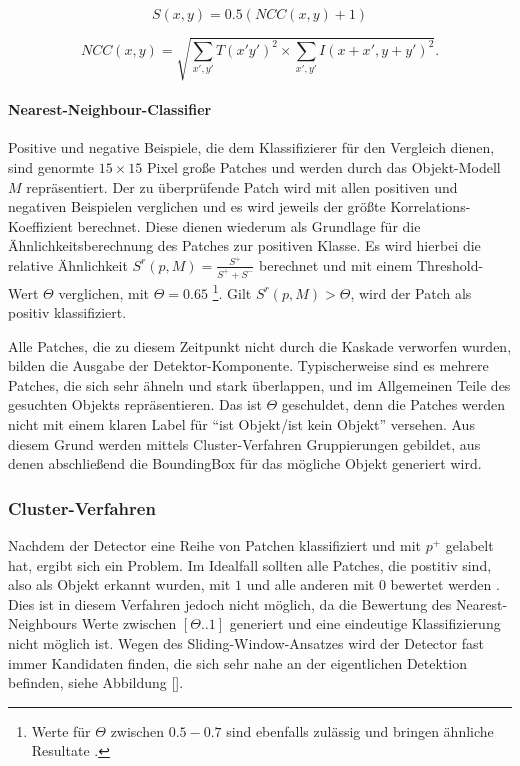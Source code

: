 	\begin{equation}
	S(x,y)=0.5(NCC(x,y)+1)
	\end{equation}

	\begin{equation}
	NCC(x,y)=\sqrt{\underset{x',y'}{\sum}T(x'y')^{2}\times\underset{x',y'}{\sum}I(x+x',y+y')^{2}}.
	\end{equation}

	\paragraph{Nearest-Neighbour-Classifier}
	Positive und negative Beispiele, die dem Klassifizierer für den Vergleich
	dienen, sind genormte $15\times15$ Pixel große Patches und werden
	durch das Objekt-Modell $M$ repräsentiert. Der zu überprüfende Patch
	wird mit allen positiven und negativen Beispielen verglichen und es
	wird jeweils der größte Korrelations-Koeffizient berechnet. Diese
	dienen wiederum als Grundlage für die Ähnlichkeitsberechnung des Patches
	zur positiven Klasse. Es wird hierbei die relative Ähnlichkeit $S^{r}(p,M)=\frac{S^{+}}{S^{+}+S^{-}}$
	berechnet und mit einem Threshold-Wert $\Theta$ verglichen, mit $\Theta=0.65$%
	\footnote{Werte für $\Theta$ zwischen $0.5-0.7$ sind ebenfalls zulässig und
	bringen ähnliche Resultate \cite{TLD}.%
	}. Gilt $S^{r}(p,M)>\Theta$, wird der Patch als positiv klassifiziert.

	Alle Patches, die zu diesem Zeitpunkt nicht durch die Kaskade verworfen
	wurden, bilden die Ausgabe der Detektor-Komponente. Typischerweise
	sind es mehrere Patches, die sich sehr ähneln und stark überlappen,
	und im Allgemeinen Teile des gesuchten Objekts repräsentieren. Das
	ist $\Theta$ geschuldet, denn die Patches werden nicht mit einem
	klaren Label für ``ist Objekt/ist kein Objekt'' versehen. Aus diesem
	Grund werden mittels Cluster-Verfahren Gruppierungen gebildet, aus
	denen abschließend die BoundingBox für das mögliche Objekt generiert
	wird. 


	\subsubsection{Cluster-Verfahren}
	Nachdem der Detector eine Reihe von Patchen klassifiziert und mit
	$p^{+}$ gelabelt hat, ergibt sich ein Problem. Im Idealfall sollten
	alle Patches, die postitiv sind, also als Objekt erkannt wurden, mit
	$1$ und alle anderen mit $0$ bewertet werden \cite{BAB}. Dies ist
	in diesem Verfahren jedoch nicht möglich, da die Bewertung des Nearest-Neighbours
	Werte zwischen $[\Theta..1]$ generiert und eine eindeutige Klassifizierung
	nicht möglich ist. Wegen des Sliding-Window-Ansatzes wird der Detector
	fast immer Kandidaten finden, die sich sehr nahe an der eigentlichen
	Detektion befinden, siehe Abbildung {[}{]}.

